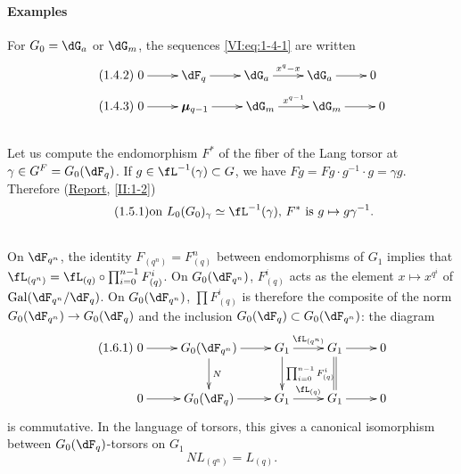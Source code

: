 \paragraph{Examples}
For $G_0=\dG_a$ or $\dG_m$, the sequences \eqref{VI:eq:1-4-1} are written 
\begin{align*}\tag{1.4.2}\label{VI:eq:1-4-2}
&\xymatrix{
  0 \ar[r] 
    & \dF_q \ar[r] 
    & \dG_a \ar[r]^-{x^q-x} 
    & \dG_a \ar[r] 
    & 0 
} \\
\tag{1.4.3}\label{VI:eq:1-4-3}
&\xymatrix{
  0 \ar[r] 
    & \dmu_{q-1} \ar[r] 
    & \dG_m \ar[r]^-{x^{q-1}} 
    & \dG_m \ar[r] 
    & 0
}
\end{align*}





\subsection{}\label{VI:1-5}

Let us compute the endomorphism $F^\ast$ of the fiber of the Lang torsor at 
$\gamma\in G^F=G_0(\dF_q)$. If $g\in \fL^{-1}(\gamma)\subset G$, we have 
$F g = F g\cdot g^{-1}\cdot g = \gamma g$. Therefore (\hyperref[II]{Report}, 
\ref{II:1-2}) 
\begin{equation*}\tag{1.5.1}\label{VI:eq:1-5-1}
  \text{on $L_0(G_0)_\gamma\simeq \fL^{-1}(\gamma)$, $F^\ast$ is $g\mapsto g\gamma^{-1}$.}
\end{equation*}





\subsection{}\label{VI:1-6}

On $\dF_{q^n}$, the identity $F_{(q^n)}=F_{(q)}^n$ between endomorphisms of 
$G_1$ implies that $\fL_{(q^n)}=\fL_{(q)}\circ \prod_{i=0}^{n-1} F_{(q)}^i$. 
On $G_0(\dF_{q^n})$, $F_{(q)}^i$ acts as the element 
$x\mapsto x^{q^i}$ of $\gal(\dF_{q^n}/\dF_q)$. On $G_0(\dF_{q^n})$, 
$\prod F_{(q)}^i$ is therefore the composite of the norm 
$G_0(\dF_{q^n})\to G_0(\dF_q)$ and the inclusion 
$G_0(\dF_q)\subset G_0(\dF_{q^n})$: the diagram 
\begin{equation*}\tag{1.6.1}\label{VI:eq:1-6-1}
\xymatrix{
  0 \ar[r] 
    & G_0(\dF_{q^n}) \ar[r] \ar[d]^-N 
    & G_1 \ar[r]^-{\fL_{(q^n)}} \ar[d]^-{\prod_{i=0}^{n-1} F_{(q)}^i} 
    & G_1 \ar[r] \ar@{=}[d] 
    & 0 \\
  0 \ar[r] 
    & G_0(\dF_q) \ar[r] 
    & G_1 \ar[r]^-{\fL_{(q)}} 
    & G_1 \ar[r] 
    & 0
}
\end{equation*}
is commutative. In the language of torsors, this gives a canonical isomorphism 
between $G_0(\dF_q)$-torsors on $G_1$ 
\begin{equation*}\tag{1.6.2}\label{VI:eq:1-6-2}
  N L_{(q^n)} = L_{(q)} \text{.}
\end{equation*}





